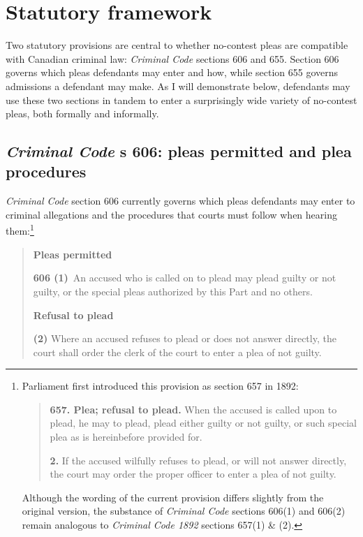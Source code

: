 \section{Statutory framework}

Two statutory provisions are central to whether no-contest pleas are compatible with Canadian criminal law: \textit{Criminal Code} sections 606 and 655. Section 606 governs which pleas defendants may enter and how, while section 655 governs admissions a defendant may make. As I will demonstrate below, defendants may use these two sections in tandem to enter a surprisingly wide variety of no-contest pleas, both formally and informally.

\subsection{\textit{Criminal Code} s 606: pleas permitted and plea procedures}

\textit{Criminal Code} section 606 currently governs which pleas defendants may enter to criminal allegations and the procedures that courts must follow when hearing them:\footnote{ Parliament first introduced this provision as section 657 in 1892:

\begin{quote}
\textbf{657. Plea; refusal to plead.} When the accused is called upon to plead, he may to plead, plead either guilty or not guilty, or such special plea as is hereinbefore provided for.

\textbf{2.} If the accused wilfully refuses to plead, or will not answer directly, the court may order the proper officer to enter a plea of not guilty. 
\end{quote}

Although the wording of the current provision differs slightly from the original version, the substance of \textit{Criminal Code} sections 606(1) and 606(2) remain analogous to \textit{Criminal Code 1892} sections 657(1) \& (2).}

\begin{quote}
    \onehalfspacing
    \textbf{Pleas permitted}
    
    \textbf{606 (1)} An accused who is called on to plead may plead guilty or not guilty, or the special pleas authorized by this Part and no others.\medskip

    \textbf{Refusal to plead}
    
    \textbf{(2)} Where an accused refuses to plead or does not answer directly, the court shall order the clerk of the court to enter a plea of not guilty.
    
\end{quote}

